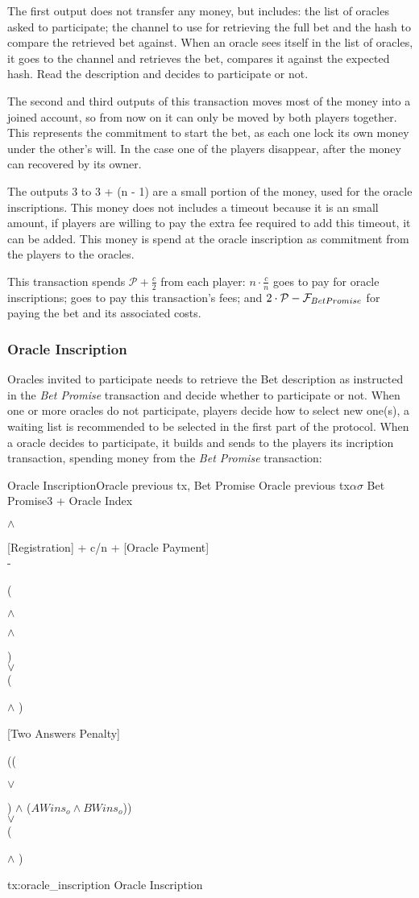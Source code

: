 The first output does not transfer any money, but includes: the list of oracles
  asked to participate; the channel to use for retrieving the full bet and the
  hash to compare the retrieved bet against.
When an oracle sees itself in the list of oracles, it goes to the channel and
  retrieves the bet, compares it against the expected hash.
Read the description and decides to participate or not.

The second and third outputs of this transaction moves most of the money into
  a joined account, so from now on it can only be moved by both players
  together.
This represents the commitment to start the bet, as each one lock its own money
  under the other's will.
In the case one of the players disappear, after  the money can
  recovered by its owner.

The outputs 3 to 3 + (n - 1) are a small portion of the money, used for the
  oracle inscriptions.
This money does not includes a timeout because it is an small amount, if players
  are willing to pay the extra fee required to add this timeout, it can be
  added.
This money is spend at the oracle inscription as commitment from the players to
  the oracles.

This transaction spends $\mathcal{P} + \frac{c}{2}$ from each player:
  $ n \cdot \frac{c}{n}$ goes to pay for oracle inscriptions; 
  goes to pay this transaction's fees; and
  $2 \cdot \mathcal{P} - \mathcal{F}_{Bet Promise} $ for paying the bet and its
  associated costs.

\subsubsection{Oracle Inscription}
Oracles invited to participate needs to retrieve the Bet description as
  instructed in the \textit{Bet Promise} transaction and decide whether to
  participate or not.
When one or more oracles do not participate, players decide how to select new
  one(s), a waiting list is recommended to be selected in the first part of the
  protocol.
When a oracle decides to participate, it builds and sends to the players its
  incription transaction, spending money from the \textit{Bet Promise}
  transaction:

\transaction
    {Oracle Inscription}{Oracle previous tx, Bet Promise}
    {Oracle previous tx}{$\alpha$}{$\sigma$}
    {Bet Promise}{3 + Oracle Index}{\signature{A} $\wedge$ \signature{B}}
    \stopinputs
    {[Registration] + c/n + [Oracle Payment] \\ - }
        {(\signature{Oracle} $\wedge$ \signature{A} $\wedge$ \signature{B}) \\
            $\vee$ \\
         (\signature{Oracle} $\wedge$ )}
    {[Two Answers Penalty]}{((\signature{A} $\vee$ \signature{B}) $\wedge$ %
                             ($AWins_o \wedge BWins_o$)) \\
                           $\vee$ \\
                       (\signature{Oracle} $\wedge$ )}
    \stopoutputs
    {tx:oracle_inscription}
    {Oracle Inscription}

